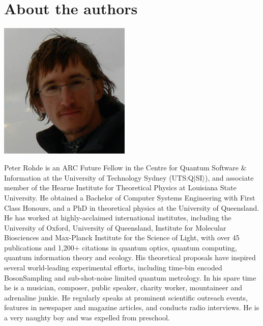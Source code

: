 %
%

\section*{About the authors}






\begin{center}
\includegraphics[width=0.47\textwidth]{photo_peter_rohde}
\end{center}

Peter Rohde is an ARC Future Fellow in the Centre for Quantum Software \& Information at the University of Technology Sydney (UTS:Q$|$SI$\rangle$), and associate member of the Hearne Institute for Theoretical Physics at Louisiana State University. He obtained a Bachelor of Computer Systems Engineering with First Class Honours, and a PhD in theoretical physics at the University of Queensland. He has worked at highly-acclaimed international institutes, including the University of Oxford, University of Queensland, Institute for Molecular Biosciences and Max-Planck Institute for the Science of Light, with over 45 publications and 1,200+ citations in quantum optics, quantum computing, quantum information theory and ecology. His theoretical proposals have inspired several world-leading experimental efforts, including time-bin encoded {\sc BosonSampling} and sub-shot-noise limited quantum metrology. In his spare time he is a musician, composer, public speaker, charity worker, mountaineer and adrenaline junkie. He regularly speaks at prominent scientific outreach events, features in newspaper and magazine articles, and conducts radio interviews. He is a very naughty boy and was expelled from preschool.

